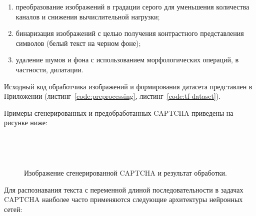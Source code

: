 \documentclass{altsu-report}
\begin{document}
\begin{enumerate}
    \item преобразование изображений в градации серого для уменьшения количества каналов и снижения вычислительной нагрузки;
    \item бинаризация изображений с целью получения контрастного представления символов (белый текст на черном фоне);
    \item удаление шумов и фона с использованием морфологических операций, в частности, дилатации.
\end{enumerate}

Исходный код обработчика изображений и формирования датасета представлен в Приложении (листинг~\ref{code:preprocessing}, листинг~\ref{code:tf-dataset}).

Примеры сгенерированных и предобработанных CAPTCHA приведены на рисунке ниже:

\begin{figure}[H]
    \centering
    \begin{minipage}[h]{0.45\linewidth}
         \\
    \end{minipage}
    \begin{minipage}[h]{0.45\linewidth}
         \\
    \end{minipage}
    \caption{Изображение сгенерированной CAPTCHA и результат обработки.}
    \label{fig:example-captcha}
\end{figure}

\vspace{-0.7cm}

Для распознавания текста с переменной длиной последовательности в задачах CAPTCHA наиболее часто применяются следующие архитектуры нейронных сетей:
\end{document}
